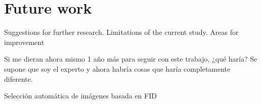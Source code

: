 \chapter{Future work} \label{sec:future}

Suggestions for further research. Limitations of the current study. Areas for improvement

Si me dieran ahora mismo 1 año más para seguir con este trabajo, ¿qué haría? Se supone que soy el experto y ahora habría cosas que haría completamente diferente.

Selección automática de imágenes basada en FID
